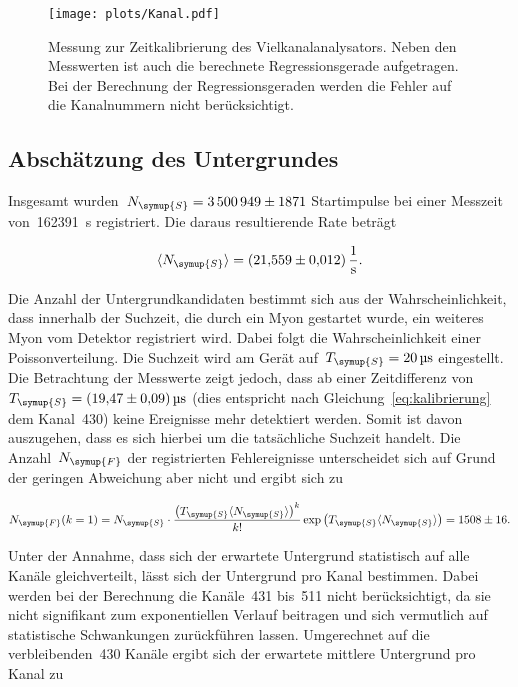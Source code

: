 \begin{figure}[htb]
  \centering
  \texttt{[image: plots/Kanal.pdf]}
  \caption{Messung zur Zeitkalibrierung des Vielkanalanalysators. Neben den
  Messwerten ist auch die berechnete Regressionsgerade aufgetragen. Bei der
  Berechnung der Regressionsgeraden werden die Fehler auf die Kanalnummern nicht
  berücksichtigt.}
  \label{fig:kalibrierung}
\end{figure}

\subsection{Abschätzung des Untergrundes}
Insgesamt wurden~$N_{\symup{S}}=\num{3500949(1871)}$ Startimpulse bei einer
Messzeit von~\SI{162391}{\second} registriert. Die daraus resultierende Rate
beträgt

\begin{equation}
  \langle N_{\symup{S}}\rangle=\SI{21.559(12)}{\per\second}.
  \label{eq:rate_start}
\end{equation}

Die Anzahl der Untergrundkandidaten bestimmt sich aus der Wahrscheinlichkeit,
dass innerhalb der Suchzeit, die durch ein Myon gestartet wurde, ein weiteres
Myon vom Detektor registriert wird. Dabei folgt die Wahrscheinlichkeit einer
Poissonverteilung. Die Suchzeit wird am Gerät
auf~$T_{\symup{S}}=\SI{20}{\micro\second}$ eingestellt. Die Betrachtung der
Messwerte zeigt jedoch, dass ab einer Zeitdifferenz
von~$T_{\symup{S}}=\SI{19.47(9)}{\micro\second}$ (dies entspricht nach
Gleichung~\eqref{eq:kalibrierung} dem Kanal~\num{430}) keine Ereignisse mehr
detektiert werden. Somit ist davon auszugehen, dass es sich hierbei um die
tatsächliche Suchzeit handelt. Die Anzahl~$N_{\symup{F}}$ der registrierten
Fehlereignisse unterscheidet sich auf Grund der geringen Abweichung aber nicht und
ergibt sich zu

\begin{equation}
  N_{\symup{F}}(k=1)=N_{\symup{S}}\cdot\frac{\left(T_{\symup{S}}\langle N_{\symup{S}}\rangle\right)^k}{k!}\exp\left(T_{\symup{S}}\langle N_{\symup{S}}\rangle\right)=\num{1508(16)}.
  \label{eq:untergrund_gesamt}
\end{equation}

Unter der Annahme, dass sich der erwartete Untergrund statistisch auf alle
Kanäle gleichverteilt, lässt sich der Untergrund pro Kanal bestimmen. Dabei
werden bei der Berechnung die Kanäle~\num{431} bis~\num{511} nicht berücksichtigt,
da sie nicht signifikant zum exponentiellen Verlauf beitragen und sich vermutlich
auf statistische Schwankungen zurückführen lassen. Umgerechnet auf die verbleibenden~\num{430} Kanäle
ergibt sich der erwartete mittlere Untergrund pro Kanal zu

